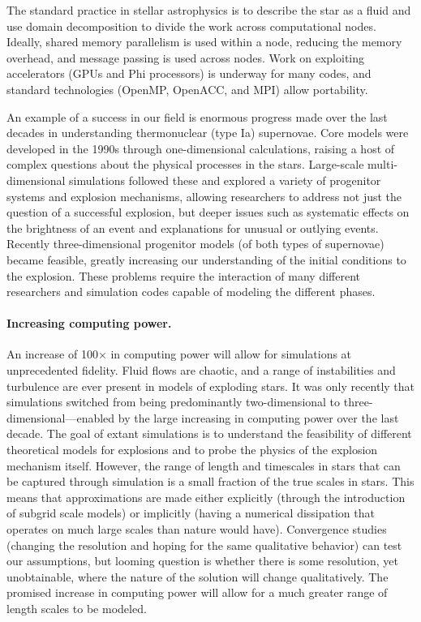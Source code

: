 \documentclass[11pt,twocolumn]{article}
\begin{document}
The standard practice in stellar astrophysics is to describe the star
as a fluid and use domain decomposition to divide the work across
computational nodes.  Ideally, shared memory parallelism is used
within a node, reducing the memory overhead, and message passing is used 
across nodes.  Work on exploiting accelerators (GPUs and Phi processors) 
is underway for many codes, and standard technologies (OpenMP, 
OpenACC, and MPI) allow portability.

An example of a success in our field is enormous progress made over
the last decades in understanding thermonuclear (type Ia) supernovae.
Core models were developed in the 1990s through one-dimensional
calculations, raising a host of complex questions about the physical
processes in the stars.  Large-scale multi-dimensional simulations 
followed these and explored a variety of progenitor systems and explosion
mechanisms, allowing researchers to address not just the question of a
successful explosion, but deeper issues such as systematic effects on
the brightness of an event and explanations for unusual or outlying
events.  Recently three-dimensional progenitor models (of both types
of supernovae) became feasible, greatly increasing our understanding
of the initial conditions to the explosion.  These problems require
the interaction of many different researchers and simulation codes
capable of modeling the different phases.  

\paragraph*{Increasing computing power.}

An increase of 100$\times$ in computing power will allow for 
simulations at unprecedented fidelity. Fluid flows are chaotic, and a
range of instabilities and turbulence are ever present in models
of exploding stars. It was only recently that simulations switched
from being predominantly two-dimensional to
three-dimensional---enabled by the large increasing in computing power
over the last decade.  The goal of extant simulations is to understand
the feasibility of different theoretical models for explosions and to
probe the physics of the explosion mechanism itself.  However, the
range of length and timescales in stars that can be captured through
simulation is a small fraction of the true scales in stars.  This
means that approximations are made either explicitly (through the
introduction of subgrid scale models) or implicitly (having a
numerical dissipation that operates on much large scales than nature
would have).  Convergence studies (changing the resolution and hoping
for the same qualitative behavior) can test our assumptions, but
looming question is whether there is some resolution, yet
unobtainable, where the nature of the solution will change
qualitatively.  The promised increase in computing power will allow
for a much greater range of length scales to be modeled.
\end{document}

